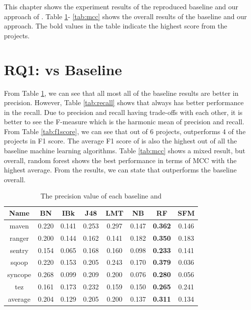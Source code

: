 This chapter shows the experiment results of the reproduced baseline and our approach of {\simfinmo}.
Table \ref{tab:precision}- \ref{tab:mcc} shows the overall results of the baseline and our approach.
The bold values in the table indicate the highest score from the projects.


\section{RQ1: {\simfinmo} vs Baseline}
From Table \ref{tab:precision}, we can see that all most all of the baseline results are better in precision.
However, Table \ref{tab:recall} shows that {\simfinmo} always has better performance in the recall.
Due to precision and recall having trade-offs with each other, it is better to see the F-measure which is the harmonic mean of precision and recall.
From Table \ref{tab:f1score}, we can see that out of 6 projects, {\simfinmo} outperforms 4 of the projects in F1 score. 
The average F1 score of {\simfinmo} is also the highest out of all the baseline machine learning algorithms.
Table \ref{tab:mcc} shows a mixed result, but overall, random forest shows the best performance in terms of MCC with the highest average.
From the results, we can state that {\simfinmo} outperforms the baseline overall.

\begin{table}[!ht]
\caption{The precision value of each baseline and \simfinmo}
\centering
\begin{tabular}{|c|c|c|c|c|c|c|c|}
\hline
Name & BN & IBk & J48 & LMT & NB & RF & SFM \\ \hline
maven & 0.220 & 0.141 & 0.253 & 0.297 & 0.147 & \textbf{0.362} & 0.146 \\ \hline
ranger & 0.200 & 0.144 & 0.162 & 0.141 & 0.182 & \textbf{0.350} & 0.183 \\ \hline
sentry & 0.154 & 0.065 & 0.168 & 0.160 & 0.098 & \textbf{0.233} & 0.141 \\ \hline
sqoop & 0.220 & 0.153 & 0.205 & 0.243 & 0.170 & \textbf{0.379} & 0.036 \\ \hline
syncope & 0.268 & 0.099 & 0.209 & 0.200 & 0.076 & \textbf{0.280} & 0.056 \\ \hline
tez & 0.161 & 0.173 & 0.232 & 0.159 & 0.150 & \textbf{0.265} & 0.241 \\ \hline
average & 0.204 & 0.129 & 0.205 & 0.200 & 0.137 & \textbf{0.311} & 0.134 \\ \hline
\end{tabular}%

\label{tab:precision}
\end{table}

